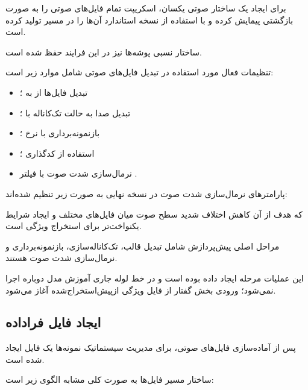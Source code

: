 \documentclass[12pt,a4paper,oneside]{report}
\begin{document}
برای ایجاد یک ساختار صوتی یکسان، اسکریپت
تمام فایل‌های صوتی را به صورت بازگشتی پیمایش کرده و با استفاده از
نسخه استاندارد آن‌ها را در مسیر
تولید کرده است.

ساختار نسبی پوشه‌ها نیز در این فرایند حفظ شده است.

تنظیمات فعال مورد استفاده در تبدیل فایل‌های صوتی شامل موارد زیر است:

\begin{itemize}

	\item تبدیل فایل‌ها از
	به
	؛

	\item تبدیل صدا به حالت تک‌کاناله با
	؛

	\item بازنمونه‌برداری با نرخ
	؛

	\item استفاده از کدگذاری
	؛

	\item نرمال‌سازی شدت صوت با فیلتر
	.

\end{itemize}

پارامترهای نرمال‌سازی شدت صوت در نسخه نهایی به صورت زیر تنظیم شده‌اند:

\begin{center}
\end{center}

که هدف از آن کاهش اختلاف شدید سطح صوت میان فایل‌های مختلف و ایجاد شرایط یکنواخت‌تر برای استخراج ویژگی است.

مراحل اصلی پیش‌پردازش شامل تبدیل قالب، تک‌کاناله‌سازی، بازنمونه‌برداری و نرمال‌سازی شدت صوت هستند.

این عملیات مرحله ایجاد داده بوده است و در خط لوله جاری آموزش مدل دوباره اجرا نمی‌شود؛ ورودی بخش گفتار از فایل ویژگی ازپیش‌استخراج‌شده آغاز می‌شود.


\subsection{ایجاد فایل فراداده}

پس از آماده‌سازی فایل‌های صوتی، برای مدیریت سیستماتیک نمونه‌ها یک فایل
ایجاد شده است.

ساختار مسیر فایل‌ها به صورت کلی مشابه الگوی زیر است:
\end{document}
